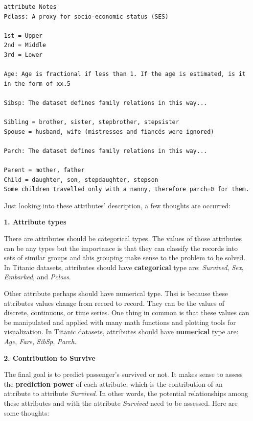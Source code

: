 \documentclass[
]{book}
\begin{document}
\begin{verbatim}
attribute Notes
Pclass: A proxy for socio-economic status (SES)

1st = Upper
2nd = Middle
3rd = Lower

Age: Age is fractional if less than 1. If the age is estimated, is it in the form of xx.5

Sibsp: The dataset defines family relations in this way...

Sibling = brother, sister, stepbrother, stepsister
Spouse = husband, wife (mistresses and fiancés were ignored)

Parch: The dataset defines family relations in this way...

Parent = mother, father
Child = daughter, son, stepdaughter, stepson
Some children travelled only with a nanny, therefore parch=0 for them.
\end{verbatim}

Just looking into these attributes' description, a few thoughts are occurred:

\textbf{1. Attribute types}

There are attributes should be categorical types. The values of those attributes can be any types but the importance is that they can classify the records into sets of similar groups and this grouping make sense to the problem to be solved. In Titanic datasets, attributes should have \textbf{categorical} type are: \emph{Survived}, \emph{Sex}, \emph{Embarked}, and \emph{Pclass}.

Other attribute perhaps should have numerical type. Thsi is because these attributes values change from record to record. They can be the values of discrete, continuous, or time series. One thing in common is that these values can be manipulated and applied with many math functions and plotting tools for visualization. In Titanic datasets, attributes should have \textbf{numerical} type are: \emph{Age}, \emph{Fare}, \emph{SibSp}, \emph{Parch}.

\textbf{2. Contribution to Survive}

The final goal is to predict passenger's survived or not. It makes sense to assess the \textbf{prediction power} of each attribute, which is the contribution of an attribute to attribute \emph{Survived}. In other words, the potential relationships among these attributes and with the attribute \emph{Survived} need to be assessed. Here are some thoughts:
\end{document}
